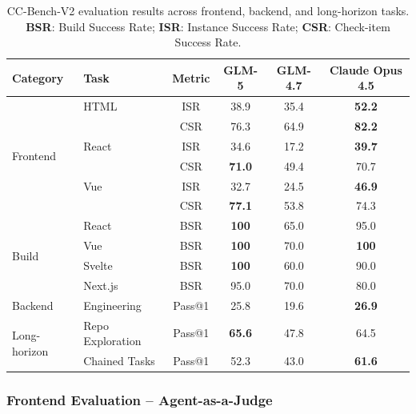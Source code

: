 \begin{table}[h!]
\centering
\caption{CC-Bench-V2 evaluation results across frontend, backend, and long-horizon tasks. \textbf{BSR}: Build Success Rate; \textbf{ISR}: Instance Success Rate; \textbf{CSR}: Check-item Success Rate.}
\label{tab:cc-bench-v2}
\begin{tabular}{llcccc}
\toprule
\textbf{Category} & \textbf{Task} & \textbf{Metric} & \textbf{GLM-5} & \textbf{GLM-4.7} & \textbf{Claude Opus 4.5} \\
\midrule
\multirow{6}{*}{Frontend}
  & HTML           & ISR     & 38.9          & 35.4          & \textbf{52.2} \\
  &                & CSR     & 76.3          & 64.9          & \textbf{82.2} \\[2pt]
  & React          & ISR     & 34.6          & 17.2          & \textbf{39.7} \\
  &                & CSR     & \textbf{71.0} & 49.4          & 70.7          \\[2pt]
  & Vue            & ISR     & 32.7          & 24.5          & \textbf{46.9} \\
  &                & CSR     & \textbf{77.1} & 53.8          & 74.3          \\
\midrule
\multirow{4}{*}{Build}
  & React          & BSR     & \textbf{100}  & 65.0          & 95.0          \\
  & Vue            & BSR     & \textbf{100}  & 70.0          & \textbf{100}  \\
  & Svelte         & BSR     & \textbf{100}  & 60.0          & 90.0          \\
  & Next.js        & BSR     & 95.0          & 70.0          & 80.0          \\
\midrule
Backend            & Engineering & Pass@1  & 25.8          & 19.6          & \textbf{26.9} \\
\midrule
\multirow{2}{*}{Long-horizon}
  & Repo Exploration   & Pass@1  & \textbf{65.6} & 47.8          & 64.5          \\
  & Chained Tasks      & Pass@1  & 52.3          & 43.0          & \textbf{61.6} \\
\bottomrule
\end{tabular}
\end{table}



\subsubsection{Frontend Evaluation -- Agent-as-a-Judge}

